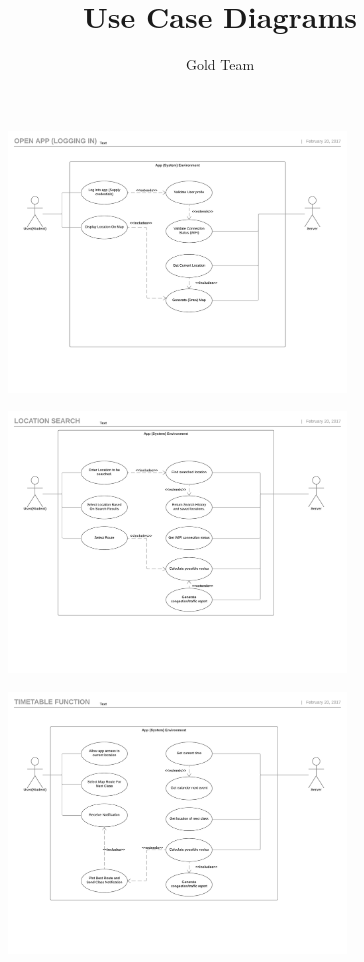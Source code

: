 \documentclass[a4paper]{article}
\title{Use Case Diagrams}
\author{Gold Team}
\begin{document}
\maketitle


\begin{figure}
\centering
\includegraphics[width=0.8\textwidth]{App_Log_In_Use-Case.pdf}

\end{figure}

\begin{figure}
\centering
\includegraphics[width=0.8\textwidth]{Location_Search_Use-Case.pdf}

\end{figure}

\begin{figure}
\centering
\includegraphics[width=0.8\textwidth]{Time_Table_Use-Case.pdf}

\end{figure}
\end{document}
